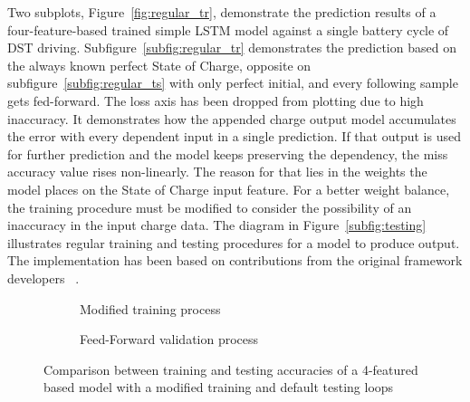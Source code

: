 %
%
Two subplots, \mbox{Figure~\ref{fig:regular_tr}}, demonstrate the prediction results of a four-feature-based trained simple LSTM model against a single battery cycle of DST driving.
\mbox{Subfigure~\ref{subfig:regular_tr}} demonstrates the prediction based on the always known perfect State of Charge, opposite on \mbox{subfigure~\ref{subfig:regular_ts}} with only perfect initial, and every following sample gets fed-forward.
The loss axis has been dropped from plotting due to high inaccuracy.
It demonstrates how the appended charge output model accumulates the error with every dependent input in a single prediction.
If that output is used for further prediction and the model keeps preserving the dependency, the miss accuracy value rises non-linearly.
The reason for that lies in the weights the model places on the State of Charge input feature.
For a better weight balance, the training procedure must be modified to consider the possibility of an inaccuracy in the input charge data.
The diagram in \mbox{Figure~\ref{subfig:testing}} illustrates regular training and testing procedures for a model to produce output.
The implementation has been based on contributions from the original framework developers ~\cite{time_2020}.
\begin{figure}[htbp]
    \centering
    \begin{subfigure}[b]{\columnwidth}
        \centering
        
        \caption{Modified training process}
    \end{subfigure}
    \begin{subfigure}[b]{\columnwidth}
        \centering
        
        \caption{Feed-Forward validation process}
    \end{subfigure}
    \caption{Comparison between training and testing accuracies of a 4-featured based model with a modified training and default testing loops}
    \label{fig:modefied_tr}
\end{figure}

